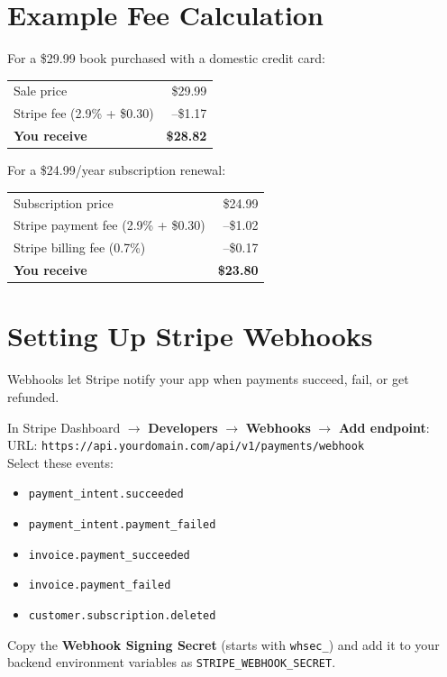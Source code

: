 \documentclass[12pt, letterpaper, oneside]{book}
\begin{document}
\section{Example Fee Calculation}

For a \$29.99 book purchased with a domestic credit card:

\begin{table}[H]
\centering
\begin{tabular}{lr}
\toprule
Sale price & \$29.99 \\
Stripe fee (2.9\% + \$0.30) & --\$1.17 \\
\textbf{You receive} & \textbf{\$28.82} \\
\bottomrule
\end{tabular}
\end{table}

For a \$24.99/year subscription renewal:
\begin{table}[H]
\centering
\begin{tabular}{lr}
\toprule
Subscription price & \$24.99 \\
Stripe payment fee (2.9\% + \$0.30) & --\$1.02 \\
Stripe billing fee (0.7\%) & --\$0.17 \\
\textbf{You receive} & \textbf{\$23.80} \\
\bottomrule
\end{tabular}
\end{table}

\section{Setting Up Stripe Webhooks}

Webhooks let Stripe notify your app when payments succeed, fail, or get refunded.

\begin{actionbox}
In Stripe Dashboard $\rightarrow$ \textbf{Developers} $\rightarrow$ \textbf{Webhooks} $\rightarrow$ \textbf{Add endpoint}:\\[4pt]
URL: \texttt{https://api.yourdomain.com/api/v1/payments/webhook}\\[4pt]
Select these events:
\begin{itemize}[leftmargin=1.5em]
  \item \texttt{payment\_intent.succeeded}
  \item \texttt{payment\_intent.payment\_failed}
  \item \texttt{invoice.payment\_succeeded}
  \item \texttt{invoice.payment\_failed}
  \item \texttt{customer.subscription.deleted}
\end{itemize}
Copy the \textbf{Webhook Signing Secret} (starts with \texttt{whsec\_}) and add it to your backend environment variables as \texttt{STRIPE\_WEBHOOK\_SECRET}.
\end{actionbox}
\end{document}

